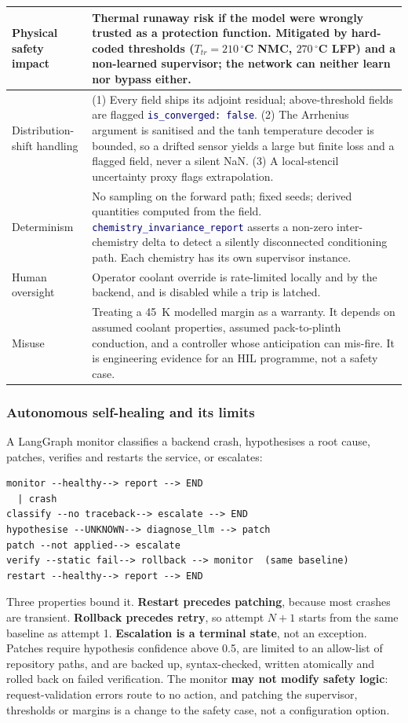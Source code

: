 \documentclass[10.5pt,a4paper]{article}
\newcommand{\code}[1]{\texttt{\textcolor{navy}{#1}}}
\begin{document}
\begin{tabularx}{\linewidth}{@{}KV@{}}
\toprule
Physical safety impact & Thermal runaway risk if the model were wrongly trusted as a protection function. Mitigated by hard-coded thresholds ($T_{tr}=210\,^\circ$C NMC, $270\,^\circ$C LFP) and a non-learned supervisor; the network can neither learn nor bypass either. \\
\midrule
Distribution-shift handling & (1) Every field ships its adjoint residual; above-threshold fields are flagged \code{is\_converged: false}. (2) The Arrhenius argument is sanitised and the tanh temperature decoder is bounded, so a drifted sensor yields a large but finite loss and a flagged field, never a silent NaN. (3) A local-stencil uncertainty proxy flags extrapolation. \\
\midrule
Determinism & No sampling on the forward path; fixed seeds; derived quantities computed from the field. \code{chemistry\_invariance\_report} asserts a non-zero inter-chemistry delta to detect a silently disconnected conditioning path. Each chemistry has its own supervisor instance. \\
\midrule
Human oversight & Operator coolant override is rate-limited locally and by the backend, and is disabled while a trip is latched. \\
\midrule
Misuse & Treating a 45~K modelled margin as a warranty. It depends on assumed coolant properties, assumed pack-to-plinth conduction, and a controller whose anticipation can mis-fire. It is engineering evidence for an HIL programme, not a safety case. \\
\bottomrule
\end{tabularx}

\subsubsection*{Autonomous self-healing and its limits}
A LangGraph monitor classifies a backend crash, hypothesises a root cause, patches, verifies and restarts the service, or escalates:
\begin{lstlisting}[language={}]
monitor --healthy--> report --> END
  | crash
classify --no traceback--> escalate --> END
hypothesise --UNKNOWN--> diagnose_llm --> patch
patch --not applied--> escalate
verify --static fail--> rollback --> monitor  (same baseline)
restart --healthy--> report --> END
\end{lstlisting}
Three properties bound it. \textbf{Restart precedes patching}, because most crashes are transient. \textbf{Rollback precedes retry}, so attempt $N{+}1$ starts from the same baseline as attempt 1. \textbf{Escalation is a terminal state}, not an exception. Patches require hypothesis confidence above 0.5, are limited to an allow-list of repository paths, and are backed up, syntax-checked, written atomically and rolled back on failed verification. The monitor \textbf{may not modify safety logic}: request-validation errors route to no action, and patching the supervisor, thresholds or margins is a change to the safety case, not a configuration option.
\end{document}
